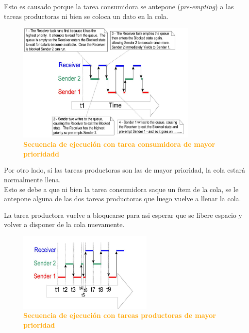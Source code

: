 \documentclass{article}
\begin{document}
Esto es causado porque la tarea consumidora se antepone (\textit{pre-empting}) a las tareas productoras ni bien se coloca un dato en la cola.\\
\begin{figure}[H]
   \centering
   \includegraphics[width=0.8\textwidth]{figures/pri2.jpg}
   \centering
   \caption{\textbf{\textcolor{Orange}{Secuencia de ejecución con tarea consumidora de mayor prioridadd}}}
\end{figure}
 

Por otro lado, si las tareas productoras son las de mayor prioridad, la cola estará normalmente llena. \\

Esto se debe a que ni bien la tarea consumidora saque un ítem de la cola, se le antepone alguna de las dos tareas productoras que luego vuelve a llenar la cola. \\
\clearpage

La tarea productora vuelve a bloquearse para asi esperar que se libere espacio y volver a disponer de la cola nuevamente.\\
\begin{figure}[H]
   \centering
   \includegraphics[width=0.6\textwidth]{figures/pri1.jpg}
   \centering
   \caption{\textbf{\textcolor{Orange}{Secuencia de ejecución con tareas productoras de mayor prioridad}}}
\end{figure}
 
\end{document}
